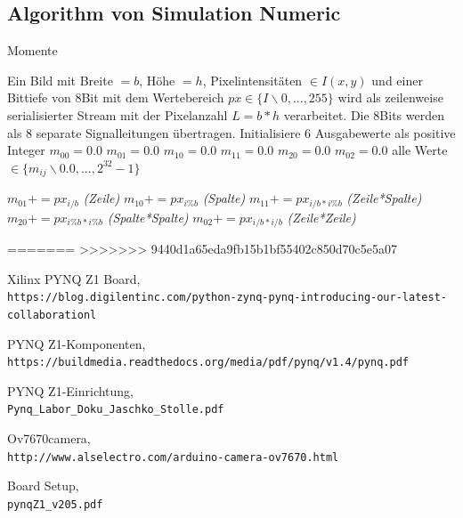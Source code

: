 \documentclass[a4paper]{report}
\begin{document}
\subsection{Algorithm von Simulation Numeric}
\begin{algorithm}
\caption{Momente}
\label{Momente}
\begin{algorithmic}[1]
\Require Ein Bild mit Breite {$=b$}, Höhe {$=h$}, Pixelintensitäten {$\in I(x,y)$} und einer Bittiefe von 8Bit mit dem Wertebereich {$px\in \{I\backslash0,...,255\}$} wird als zeilenweise serialisierter Stream mit der Pixelanzahl {$L=b*h$} verarbeitet. Die 8Bits werden als 8 separate Signalleitungen übertragen.  Initialisiere 6 Ausgabewerte als positive Integer {$m_{00}=0.0$} {$m_{01}=0.0$} {$m_{10}=0.0$} {$m_{11}=0.0$} {$m_{20}=0.0$} {$m_{02}=0.0$} alle Werte {$\in \{m_{ij}\backslash0.0,...,2^{32}-1\}$}

	    \State $m_{01}+= px_{i/b}$ \textit{(Zeile)}
    	\State $m_{10}+=px_{i\%b}$ \textit{(Spalte)}
    	\State $m_{11}+=px_{i/b * i\%b}$ \textit{(Zeile*Spalte)}
    	\State $m_{20}+=px_{i\%b * i\%b}$ \textit{(Spalte*Spalte)}
    	\State $m_{02}+=px_{i/b * i/b}$ \textit{(Zeile*Zeile)}
    \EndIf
\EndFor
\end{algorithmic}
\end{algorithm}




=======
>>>>>>> 9440d1a65eda9fb15b1bf55402c850d70c5e5a07
\begin{thebibliography}{9}

Xilinx PYNQ Z1 Board,
\\\texttt{https://blog.digilentinc.com/python-zynq-pynq-introducing-our-latest-collaborationl}

PYNQ Z1-Komponenten,
\\\texttt{https://buildmedia.readthedocs.org/media/pdf/pynq/v1.4/pynq.pdf}

PYNQ Z1-Einrichtung,
\\\texttt{Pynq{\_}Labor{\_}Doku{\_}Jaschko{\_}Stolle.pdf}

Ov7670camera,
\\\texttt{http://www.alselectro.com/arduino-camera-ov7670.html}

Board Setup,
\\\texttt{pynqZ1{\_}v205.pdf}
\end{thebibliography}
\end{document}
